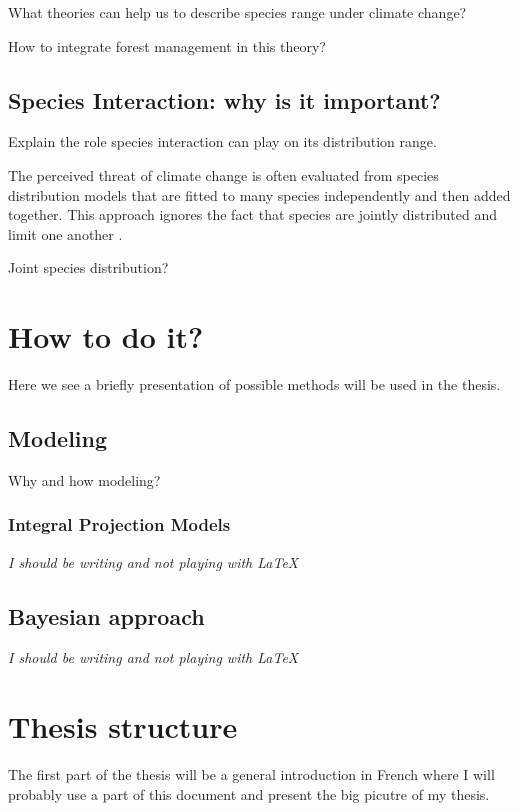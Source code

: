 What theories can help us to describe species range under climate change?

How to integrate forest management in this theory?

\subsection*{Species Interaction: why is it important?}
Explain the role species interaction can play on its distribution range.

The perceived threat of climate change is often evaluated from species distribution models that are fitted to many species independently and then added together. This approach ignores the fact that species are jointly distributed and limit one another \citep{clark2014}.

Joint species distribution?

\section{How to do it?}

Here we see a briefly presentation of possible methods will be used in the thesis.

\subsection*{Modeling}

Why and how modeling?

\subsubsection*{Integral Projection Models}

\textit{I should be writing and not playing with \LaTeX}

\subsection*{Bayesian approach}

\textit{I should be writing and not playing with \LaTeX}

\section{Thesis structure}

The first part of the thesis will be a general introduction in French where  I will probably use a part of this document and present the big picutre of my thesis.

